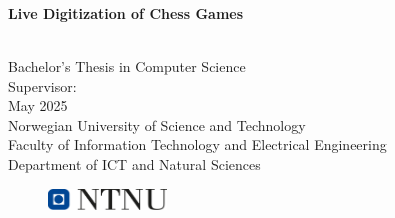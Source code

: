 \begin{titlepage}
\vspace*{1.5cm}

\noindent  \textcolor{gray}{\large 
\birgitte \\ 
\chris \\ 
\vegard} \\
\vspace{1cm}

\noindent \textbf{\Large Live Digitization of Chess Games} \\
\vspace{0.5cm}

 \\

\vspace{7cm}
\noindent Bachelor's Thesis in Computer Science \\
Supervisor: \saleh \\
May 2025 \\

\vspace{0.2cm}
\noindent Norwegian University of Science and Technology \\
Faculty of Information Technology and Electrical Engineering \\
Department of ICT and Natural Sciences \\

\begin{figure}[h]
    \includegraphics[width=0.28\textwidth]{figures/ntnu_basic.png}
\end{figure}
\end{titlepage}
\restoregeometry
\myemptypage %